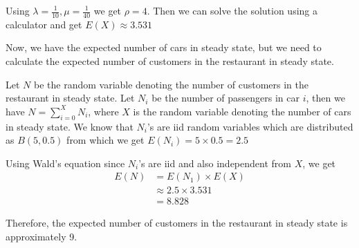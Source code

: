 \documentclass[12pt, oneside]{article}
\begin{document}
\begin{enumerate}
{    Using \(\lambda = \frac{1}{10}, \mu = \frac{1}{40}\) we get \(\rho = 4\). Then we can
    solve the solution using a calculator and get \(E(X) \approx 3.531\)

    Now, we have the expected number of cars in steady state, but we need to calculate the
    expected number of customers in the restaurant in steady state.

    Let \(N\) be the random variable denoting the number of customers in the restaurant in
    steady state. Let \(N_i\) be the number of passengers in car \(i\), then we have 
    \(N = \sum_{i = 0}^{X} N_i\), where \(X\) is the random variable denoting the number of cars
    in steady state. We know that \(N_i\)'s are iid random variables which 
    are distributed as \(B(5, 0.5)\) from which we get \(E(N_i) = 5 \times 0.5 = 2.5\)

    Using Wald's equation since \(N_i\)'s are iid and also independent from \(X\), we get
    \begin{align*}
        E(N) &= E(N_1) \times E(X) \\
             &\approx 2.5 \times 3.531 \\
             &= 8.828
    \end{align*}

    Therefore, the expected number of customers in the restaurant in steady state is
    approximately 9.
}

\end{enumerate}
\end{document}
